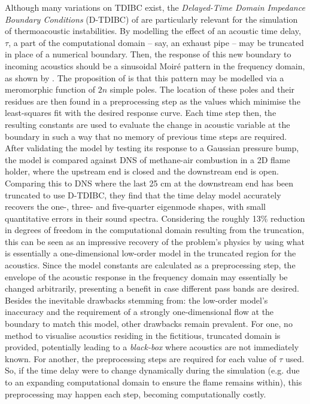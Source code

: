 Although many variations on TDIBC exist, the \emph{Delayed-Time Domain Impedance Boundary Conditions} (D-TDIBC) of \cite{douasbin2018DelayedtimeDomainImpedance} are particularly relevant for the simulation of thermoacoustic instabilities. By modelling the effect of an acoustic time delay, $τ$, a part of the computational domain -- say, an exhaust pipe -- may be truncated in place of a numerical boundary. Then, the response of this new boundary to incoming acoustics should be a sinusoidal Moiré pattern in the frequency domain, as shown by . The proposition of \cite{douasbin2018DelayedtimeDomainImpedance} is that this pattern may be modelled via a meromorphic function of $2n$ simple poles. The location of these poles and their residues are then found in a preprocessing step as the values which minimise the least-squares fit with the desired response curve. Each time step then, the resulting constants are used to evaluate the change in acoustic variable at the boundary in such a way that no memory of previous time steps are required. After validating the model by testing its response to a Gaussian pressure bump, the model is compared against DNS of methane-air combustion in a 2D flame holder, where the upstream end is closed and the downstream end is open. Comparing this to DNS where the last 25 cm at the downstream end has been truncated to use D-TDIBC, they find that the time delay model accurately recovers the one-, three- and five-quarter eigenmode shapes, with small quantitative errors in their sound spectra. Considering the roughly 13\% reduction in degrees of freedom in the computational domain resulting from the truncation, this can be seen as an impressive recovery of the problem's physics by using what is essentially a one-dimensional low-order model in the truncated region for the acoustics. Since the model constants are calculated as a preprocessing step, the envelope of the acoustic response in the frequency domain may essentially be changed arbitrarily, presenting a benefit in case different pass bands are desired. Besides the inevitable drawbacks stemming from: the low-order model's inaccuracy and the requirement of a strongly one-dimensional flow at the boundary to match this model, other drawbacks remain prevalent. For one, no method to visualise acoustics residing in the fictitious, truncated domain is provided, potentially leading to a \emph{black-box} where acoustics are not immediately known. For another, the preprocessing steps are required for each value of $τ$ used. So, if the time delay were to change dynamically during the simulation (e.g. due to an expanding computational domain to ensure the flame remains within), this preprocessing may happen each step, becoming computationally costly.





